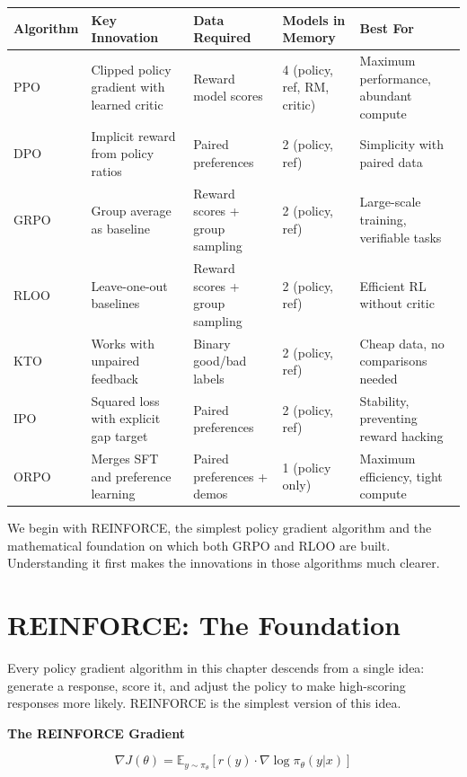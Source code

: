 \begin{chapterenv}
\begin{center}
\begin{tabular}{p{}p{}p{}p{}p{}}
\toprule
\textbf{Algorithm} & \textbf{Key Innovation} & \textbf{Data Required} & \textbf{Models in Memory} & \textbf{Best For} \\
\midrule
PPO & Clipped policy gradient with learned critic & Reward model scores & 4 (policy, ref, RM, critic) & Maximum performance, abundant compute \\
DPO & Implicit reward from policy ratios & Paired preferences & 2 (policy, ref) & Simplicity with paired data \\
GRPO & Group average as baseline & Reward scores + group sampling & 2 (policy, ref) & Large-scale training, verifiable tasks \\
RLOO & Leave-one-out baselines & Reward scores + group sampling & 2 (policy, ref) & Efficient RL without critic \\
KTO & Works with unpaired feedback & Binary good/bad labels & 2 (policy, ref) & Cheap data, no comparisons needed \\
IPO & Squared loss with explicit gap target & Paired preferences & 2 (policy, ref) & Stability, preventing reward hacking \\
ORPO & Merges SFT and preference learning & Paired preferences + demos & 1 (policy only) & Maximum efficiency, tight compute \\
\bottomrule
\end{tabular}
\end{center}

We begin with REINFORCE, the simplest policy gradient algorithm and the mathematical foundation on which both GRPO and RLOO are built. Understanding it first makes the innovations in those algorithms much clearer.

\section{REINFORCE: The Foundation}

Every policy gradient algorithm in this chapter descends from a single idea: generate a response, score it, and adjust the policy to make high-scoring responses more likely. REINFORCE is the simplest version of this idea.

\begin{infobox}
\textbf{The REINFORCE Gradient}

$$\nabla J(\theta) = \mathbb{E}_{y \sim \pi_\theta}\!\left[r(y) \cdot \nabla \log \pi_\theta(y|x)\right]$$


\end{infobox}
\end{chapterenv}
